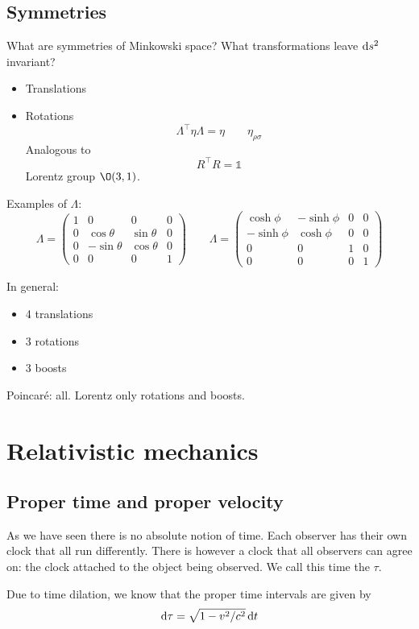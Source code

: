 \section{Symmetries}
What are symmetries of Minkowski space? What transformations leave $\operatorname{d \!}{s}^2$ invariant?
\begin{itemize}
\item Translations
\item Rotations
\[ \Lambda^\intercal \eta \Lambda = \eta \qquad \eta_{\rho\sigma} \]
Analogous to
\[ R^\intercal R = \mathbb{1} \]
Lorentz group $\O(3,1)$. 
\end{itemize}
Examples of $\Lambda$:
\[ \Lambda = \begin{pmatrix}
1 & 0 & 0 & 0 \\
0 & \cos\theta & \sin\theta & 0 \\
0 & -\sin\theta & \cos\theta & 0 \\
0 & 0 & 0 & 1
\end{pmatrix} \qquad \Lambda = \begin{pmatrix}
\cosh\phi & - \sinh\phi & 0 & 0 \\
-\sinh\phi & \cosh\phi & 0 & 0 \\
0 & 0 & 1 & 0 \\
0 & 0 & 0 & 1 
\end{pmatrix} \]

In general:
\begin{itemize}
\item 4 translations
\item 3 rotations
\item 3 boosts
\end{itemize}
Poincaré: all. Lorentz only rotations and boosts.

\chapter{Relativistic mechanics}
\section{Proper time and proper velocity}
As we have seen there is no absolute notion of time. Each observer has their own clock that all run differently. There is however a clock that all observers can agree on: the clock attached to the object being observed. We call this time the  $\tau$.

Due to time dilation, we know that the proper time intervals are given by
\[ \operatorname{d \!}{\tau} = \sqrt{1- v^2 / c^2} \operatorname{d \!}{t} \]

